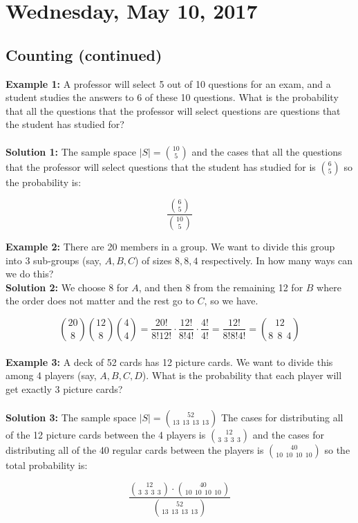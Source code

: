 \documentclass[12pt]{article}
\begin{document}
\pagebreak

\section{Wednesday, May 10, 2017}

\subsection{Counting (continued)}

\textbf{Example 1:} A professor will select 5 out of 10 questions for an exam, and a student studies the answers to 6 of these 10 questions. What is the probability that all the questions that the professor will select questions are questions that the student has studied for?\\
\\
\textbf{Solution 1:} The sample space $|S| = \binom{10}{5}$ and the cases that all the questions that the professor will select questions that the student has studied for is $\binom{6}{5}$ so the probability is:

$$\frac{\binom{6}{5}}{\binom{10}{5}}$$

\textbf{Example 2:} There are 20 members in a group. We want to divide this group into 3 sub-groups (say, $A, B, C$) of sizes $8,8,4$ respectively. In how many ways can we do this?\\

\textbf{Solution 2:} We choose 8 for $A$, and then 8 from the remaining 12 for $B$ where the order does not matter and the rest go to $C$, so we have.

$$\binom{20}{8} \binom{12}{8} \binom{4}{4} = \frac{20!}{8! 12!} \cdot \frac{12!}{8! 4!} \cdot \frac{4!}{4!} = \frac{12!}{8!8!4!} = \binom{12}{8\:\: 8\:\: 4}$$
\\
\textbf{Example 3:} A deck of 52 cards has 12 picture cards. We want to divide this among 4 players (say, $A, B, C, D$). What is the probability that each player will get exactly 3 picture cards?\\
\\
\textbf{Solution 3:} The sample space $|S| = \binom{52}{13\:\:13\:\:13\:\:13}$ The cases for distributing all of the 12 picture cards between the 4 players is $\binom{12}{3\:\:3\:\:3\:\:3}$ and the cases for distributing all of the 40 regular cards between the players is $\binom{40}{10\:\:10\:\:10\:\:10}$ so the total probability is:

$$\frac{\binom{12}{3\:\:3\:\:3\:\:3} \cdot \binom{40}{10\:\:10\:\:10\:\:10}}{\binom{52}{13\:\:13\:\:13\:\:13}}$$
\end{document}
